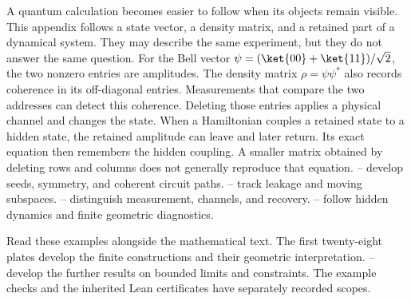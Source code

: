 A quantum calculation becomes easier to follow when its objects remain visible. This appendix follows a state vector, a density matrix, and a retained part of a dynamical system. They may describe the same experiment, but they do not answer the same question.
For the Bell vector $\psi=(\ket{00}+\ket{11})/\sqrt2$, the two nonzero entries are amplitudes. The density matrix $\rho=\psi\psi^*$ also records coherence in its off-diagonal entries. Measurements that compare the two addresses can detect this coherence. Deleting those entries applies a physical channel and changes the state.
When a Hamiltonian couples a retained state to a hidden state, the retained amplitude can leave and later return. Its exact equation then remembers the hidden coupling. A smaller matrix obtained by deleting rows and columns does not generally reproduce that equation.
-- develop seeds, symmetry, and coherent circuit paths. -- track leakage and moving subspaces. -- distinguish measurement, channels, and recovery. -- follow hidden dynamics and finite geometric diagnostics.

Read these examples alongside the mathematical text. The first twenty-eight plates develop the finite constructions and their geometric interpretation. -- develop the further results on bounded limits and constraints. The example checks and the inherited Lean certificates have separately recorded scopes.

